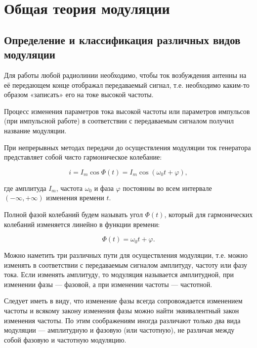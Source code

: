 
\usepackage{gensymb}
\usepackage{textcomp}
\usepackage{pythontex}


\def\labauthors{Карусевич А.А, Понур К.А.}
\def\labgroup{430}
\def\department{Кафедра радиоэлектроники}
\def\labnumber{1}
\def\labtheme{Исследование амплитудной модуляции}

\renewcommand{\Re}{\operatorname{Re}}
\renewcommand{\Im}{\operatorname{Im}}
\renewcommand{\phi}{\varphi}
\renewcommand{\hat}{\widehat}




\section{Общая теория модуляции}
\subsection{Определение и классификация различных видов модуляции}

Для работы любой радиолинии необходимо, чтобы ток возбуждения антенны на её передающем конце отображал передаваемый сигнал, т.е. необходимо каким-то образом «записать» его на токе высокой частоты.

Процесс изменения параметров тока высокой частоты или параметров импульсов (при импульсной работе) в соответствии с передаваемым сигналом получил название модуляции.

При непрерывных методах передачи до осуществления модуляции ток генератора представляет собой чисто гармоническое колебание:

$$i = I_m\cos{\Phi(t)} = I_m\cos{(\omega_0 t + \varphi)},$$

где амплитуда $I_m$, частота $\omega_0$ и фаза $\varphi$ постоянны во всем интервале $(-\infty, +\infty)$ изменения времени $t$.

Полной фазой колебаний будем называть угол $\Phi(t)$, который для гармонических колебаний изменяется линейно в функции времени:

$$\Phi(t) = \omega_0 t + \varphi.$$

Можно наметить три различных пути для осуществления модуляции, т.е. можно изменять в соответствии с передаваемым сигналом амплитуду, частоту или фазу тока. Если изменять амплитуду, то модуляция называется амплитудной, при изменении фазы — фазовой, а при изменении частоты — частотной.

Следует иметь в виду, что изменение фазы всегда сопровождается изменением частоты и всякому закону изменения фазы можно найти эквивалентный закон изменения частоты. По этим соображениям иногда различают только два вида модуляции — амплитудную и фазовую (или частотную), не различая между собой фазовую и частотную модуляцию.

